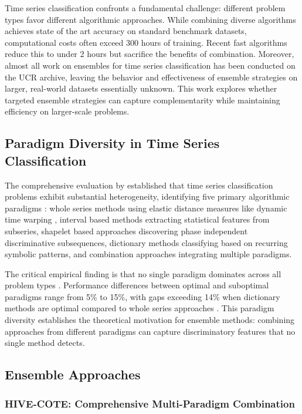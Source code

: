 \documentclass[pdflatex,sn-basic]{sn-jnl}           %
\theoremstyle{thmstyleone}%
\theoremstyle{thmstyletwo}%
\theoremstyle{thmstylethree}%
\begin{document}
Time series classification confronts a fundamental challenge: different problem types favor different algorithmic approaches. While combining diverse algorithms achieves state of the art accuracy on standard benchmark datasets, computational costs often exceed 300 hours of training. Recent fast algorithms reduce this to under 2 hours but sacrifice the benefits of combination. Moreover, almost all work on ensembles for time series classification has been conducted on the UCR archive, leaving the behavior and effectiveness of ensemble strategies on larger, real-world datasets essentially unknown. This work explores whether targeted ensemble strategies can capture complementarity while maintaining efficiency on larger-scale problems.

\subsection{Paradigm Diversity in Time Series Classification}

The comprehensive evaluation by \citet{tsc-bakeoff} established that time series classification problems exhibit substantial heterogeneity, identifying five primary algorithmic paradigms \citep[Section~2, pp.~610--611]{tsc-bakeoff}: whole series methods using elastic distance measures like dynamic time warping \citep[p.~611]{tsc-bakeoff}, interval based methods extracting statistical features from subseries, shapelet based approaches discovering phase independent discriminative subsequences, dictionary methods classifying based on recurring symbolic patterns, and combination approaches integrating multiple paradigms.

The critical empirical finding is that no single paradigm dominates across all problem types \citep[Table~11, p.~648]{tsc-bakeoff}. Performance differences between optimal and suboptimal paradigms range from 5\% to 15\%, with gaps exceeding 14\% when dictionary methods are optimal compared to whole series approaches \citep[Table~11, p.~648]{tsc-bakeoff}. This paradigm diversity establishes the theoretical motivation for ensemble methods: combining approaches from different paradigms can capture discriminatory features that no single method detects.

\subsection{Ensemble Approaches}

\subsubsection{HIVE-COTE: Comprehensive Multi-Paradigm Combination}
\end{document}

